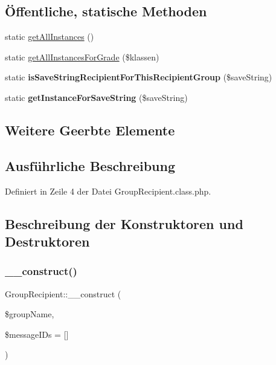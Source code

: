 \subsection*{Öffentliche, statische Methoden}
\begin{DoxyCompactItemize}
\item 
static \mbox{\hyperlink{class_group_recipient_a704918a8e4563a6072c968ba2cadbfcc}{get\+All\+Instances}} ()
\item 
static \mbox{\hyperlink{class_group_recipient_a08b8e01254655e2014cded1dbe909a4c}{get\+All\+Instances\+For\+Grade}} (\$klassen)
\item 
\mbox{\label{class_group_recipient_ada722c6ed23d8aa724147add11446dcd}} 
static {\bfseries is\+Save\+String\+Recipient\+For\+This\+Recipient\+Group} (\$save\+String)
\item 
\mbox{\label{class_group_recipient_a25ab92f434c2db2f140b5ea237c3894d}} 
static {\bfseries get\+Instance\+For\+Save\+String} (\$save\+String)
\end{DoxyCompactItemize}
\subsection*{Weitere Geerbte Elemente}


\subsection{Ausführliche Beschreibung}


Definiert in Zeile 4 der Datei Group\+Recipient.\+class.\+php.



\subsection{Beschreibung der Konstruktoren und Destruktoren}
\mbox{\label{class_group_recipient_a758a9455b296502ea506ced2a267ad02}} 
\subsubsection{\texorpdfstring{\+\_\+\+\_\+construct()}{\_\_construct()}}
{\footnotesize\ttfamily Group\+Recipient\+::\+\_\+\+\_\+construct (\begin{DoxyParamCaption}\item[{}]{\$group\+Name,  }\item[{}]{\$message\+I\+Ds = {\ttfamily \mbox{[}\mbox{]}} }\end{DoxyParamCaption})}


